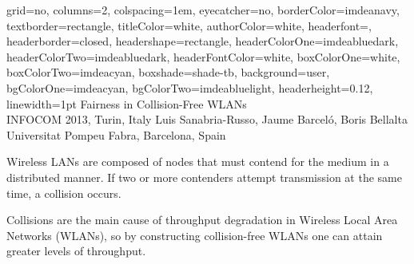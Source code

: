\documentclass[portrait,a0paper]{baposter}
\begin{document}
\begin{poster}
{
	grid=no,
	columns=2,
	colspacing=1em,
	eyecatcher=no,
	borderColor=imdeanavy,
	textborder=rectangle,
  	titleColor=white,
    	authorColor=white,
	headerfont=\textsf,
	headerborder=closed,
	headershape=rectangle,
	headerColorOne=imdeabluedark,
	headerColorTwo=imdeabluedark,
	headerFontColor=white,
	boxColorOne=white,
	boxColorTwo=imdeacyan,
	boxshade=shade-tb,
	background=user,
	bgColorOne=imdeacyan,
	bgColorTwo=imdeabluelight,
	headerheight=0.12\textheight,
	linewidth=1pt
}
{
}
{Fairness in Collision-Free WLANs\\ 
\normalsize INFOCOM 2013, Turin, Italy}
{
	Luis Sanabria-Russo, Jaume Barcel{\'o}, Boris Bellalta
	\\
	\normalsize Universitat Pompeu Fabra, Barcelona, Spain
}



{

Wireless LANs are composed of nodes that must contend for the medium in a distributed manner. If two or more contenders attempt transmission at the same time, a collision occurs. %

Collisions are the main cause of throughput degradation in Wireless Local Area Networks (WLANs), so by constructing collision-free WLANs one can attain greater levels of throughput.


}


\end{poster}
\end{document}
